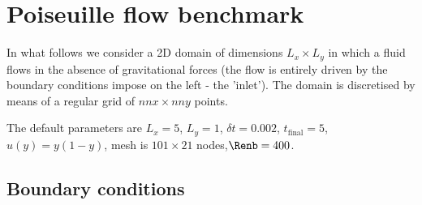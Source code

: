 \section*{Poiseuille flow benchmark}

In what follows we consider a 2D domain of dimensions $L_x \times L_y$ in which 
a fluid flows in the absence of gravitational forces (the flow is entirely driven by 
the boundary conditions impose on the left - the 'inlet'). The domain is discretised by means of a regular grid 
of $nnx \times nny$ points. 

The default parameters are $L_x=5$, $L_y=1$, $\delta t=0.002$, $t_{\text{final}}=5$,
$u(y)=y(1-y)$, mesh is $101\times 21$ nodes,$\Renb=400$.


\subsection*{Boundary conditions}


